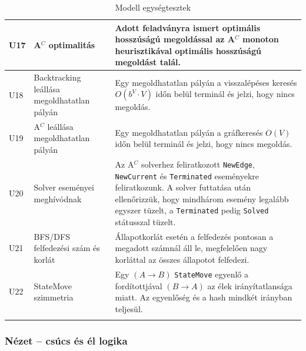 \begin{center}
\begin{longtable}{ | p{} | p{} | p{} | }
U17
& A$^C$ optimalitás
& Adott feladványra ismert optimális hosszúságú megoldással az A$^C$ monoton heurisztikával optimális hosszúságú megoldást talál.
\\ \hline

U18
& Backtracking leállása megoldhatatlan pályán
& Egy megoldhatatlan pályán a visszalépéses keresés $O(b^V \cdot V)$ időn belül terminál és jelzi, hogy nincs megoldás.
\\ \hline

U19
& A$^C$ leállása megoldhatatlan pályán
& Egy megoldhatatlan pályán a gráfkeresés $O(V)$ időn belül terminál és jelzi, hogy nincs megoldás.
\\ \hline

U20
& Solver eseményei meghívódnak
& Az A$^C$ solverhez feliratkozott \texttt{NewEdge}, \texttt{NewCurrent} és \texttt{Terminated} eseményekre feliratkozunk. A solver futtatása után ellenőrizzük, hogy mindhárom esemény legalább egyszer tüzelt, a \texttt{Terminated} pedig \texttt{Solved} státusszal tüzelt.
\\ \hline

U21
& BFS/DFS felfedezési szám és korlát
& Állapotkorlát esetén a felfedezés pontosan a megadott számnál áll le, megfelelően nagy korláttal az összes állapotot felfedezi.
\\ \hline

U22
& StateMove szimmetria
& Egy $(A \to B)$ \texttt{StateMove} egyenlő a fordítottjával $(B \to A)$ az élek irányítatlansága miatt. Az egyenlőség és a hash mindkét irányban teljesül.
\\ \hline

\caption{Modell egységtesztek}
\label{tab:ut-discoverers}
\end{longtable}
\end{center}


\subsubsection{Nézet – csúcs és él logika}

